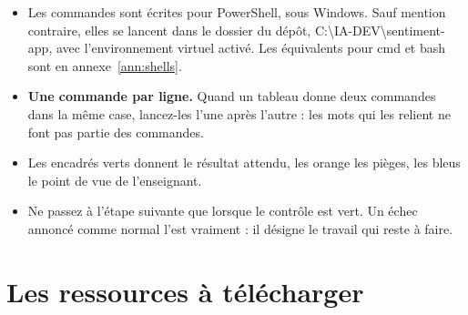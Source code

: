 \documentclass[11pt,a4paper]{article}
\newcommand{\co}[1]{{\ttfamily\hyphenchar\font=45\relax #1}}
\newcommand{\bs}{\textbackslash\allowbreak{}}
\begin{document}
\begin{itemize}
\item Les commandes sont écrites pour PowerShell, sous Windows. Sauf mention contraire, elles se lancent dans
le dossier du dépôt, \co{C:\bs IA-DEV\bs sentiment-app}, avec l'environnement virtuel activé. Les équivalents
pour cmd et bash sont en annexe~\ref{ann:shells}.
\item \textbf{Une commande par ligne.} Quand un tableau donne deux commandes dans la même case, lancez-les
l'une après l'autre : les mots qui les relient ne font pas partie des commandes.
\item Les encadrés verts donnent le résultat attendu, les orange les pièges, les bleus le point de vue de
l'enseignant.
\item Ne passez à l'étape suivante que lorsque le contrôle est vert. Un échec annoncé comme normal l'est
vraiment : il désigne le travail qui reste à faire.
\end{itemize}

\section{Les ressources à télécharger}
\end{document}
